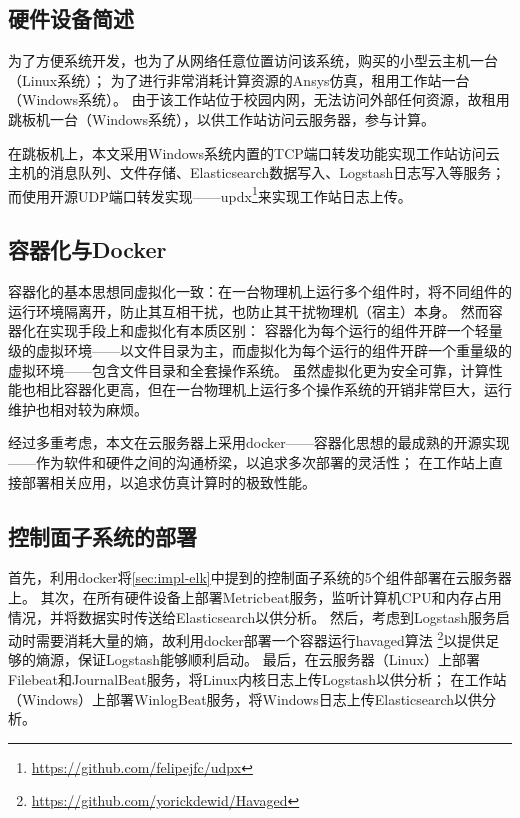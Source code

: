 \documentclass[index]{subfiles}
\begin{document}
\subsection{硬件设备简述}
为了方便系统开发，也为了从网络任意位置访问该系统，购买的小型云主机一台（Linux系统）；
为了进行非常消耗计算资源的Ansys仿真，租用工作站一台（Windows系统）。
由于该工作站位于校园内网，无法访问外部任何资源，故租用跳板机一台（Windows系统），以供工作站访问云服务器，参与计算。

在跳板机上，本文采用Windows系统内置的TCP端口转发功能实现工作站访问云主机的消息队列、文件存储、Elasticsearch数据写入、Logstash日志写入等服务；
而使用开源UDP端口转发实现——updx\footnote{\href{https://github.com/felipejfc/udpx}{https://github.com/felipejfc/udpx}}来实现工作站日志上传。

\subsection{容器化与Docker}
容器化的基本思想同虚拟化一致：在一台物理机上运行多个组件时，将不同组件的运行环境隔离开，防止其互相干扰，也防止其干扰物理机（宿主）本身。
然而容器化在实现手段上和虚拟化有本质区别：
容器化为每个运行的组件开辟一个轻量级的虚拟环境——以文件目录为主，而虚拟化为每个运行的组件开辟一个重量级的虚拟环境——包含文件目录和全套操作系统。
虽然虚拟化更为安全可靠，计算性能也相比容器化更高，但在一台物理机上运行多个操作系统的开销非常巨大，运行维护也相对较为麻烦\cite{docker}。

经过多重考虑，本文在云服务器上采用docker——容器化思想的最成熟的开源实现——作为软件和硬件之间的沟通桥梁，以追求多次部署的灵活性；
在工作站上直接部署相关应用，以追求仿真计算时的极致性能。

\subsection{控制面子系统的部署}
首先，利用docker将\cref{sec:impl-elk}中提到的控制面子系统的5个组件部署在云服务器上。
其次，在所有硬件设备上部署Metricbeat服务，监听计算机CPU和内存占用情况，并将数据实时传送给Elasticsearch以供分析。
然后，考虑到Logstash服务启动时需要消耗大量的熵，故利用docker部署一个容器运行havaged算法
\footnote{\href{https://github.com/yorickdewid/Havaged}{https://github.com/yorickdewid/Havaged}}以提供足够的熵源，保证Logstash能够顺利启动。
最后，在云服务器（Linux）上部署Filebeat和JournalBeat服务，将Linux内核日志上传Logstash以供分析；
在工作站（Windows）上部署WinlogBeat服务，将Windows日志上传Elasticsearch以供分析。
\end{document}
